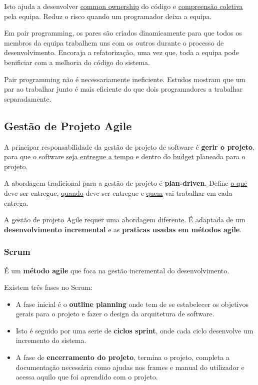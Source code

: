 \documentclass{article}
\begin{document}
\vspace{2mm}

Isto ajuda a desenvolver \uline{common ownership} do código e
\uline{compreensão coletiva} pela equipa.
Reduz o risco quando um programador deixa a equipa.

\vspace{2mm}

Em pair programming, os pares são criados dinamicamente
para que todos os membros da equipa trabalhem uns com os outros durante
o processo de desenvolvimento. Encoraja a refatorização, uma vez que,
toda a equipa pode benificiar com a melhoria do código do sistema.

\vspace{2mm}

Pair programming não é necessariamente ineficiente. Estudos mostram
que um par ao trabalhar junto é mais eficiente do que dois programadores
a trabalhar separadamente.

\subsection{Gestão de Projeto Agile}

A principar responsabilidade da gestão de projeto de software é
\textbf{gerir o projeto}, para que o software \uline{seja entregue a tempo}
e dentro do \uline{budget} planeada para o projeto.

\vspace{2mm}

A abordagem tradicional para a gestão de projeto é \textbf{plan-driven}.
Define \uline{o que} deve ser entregue, \uline{quando} deve ser entregue e \uline{quem}
vai trabalhar em cada entrega.

\vspace{2mm}

A gestão de projeto Agile requer uma abordagem diferente.
É adaptada de um \textbf{desenvolvimento incremental} e as \textbf{praticas
usadas em métodos agile}.

\subsubsection{Scrum}

É um \textbf{método agile} que foca na gestão incremental do desenvolvimento.

\vspace{2mm}

Existem três fases no Scrum:
\begin{itemize}
  \item A fase inicial é o \textbf{outline planning} onde tem de se estabelecer
  os objetivos gerais para o projeto e fazer o design da arquitetura
  de software.

  \item Isto é seguido por uma serie de \textbf{ciclos sprint}, onde cada
  ciclo desenvolve um incremento do sistema.

  \item A fase de \textbf{encerramento do projeto}, termina o projeto,
  completa a documentação necessária como ajudas nos frames e manual do
  utilizador e acessa aquilo que foi aprendido com o projeto.
\end{itemize}
\end{document}
